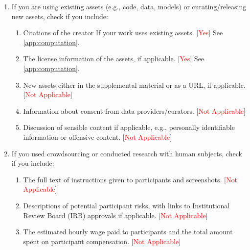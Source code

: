 \documentclass[twoside]{article}
\begin{document}
{\begin{enumerate}
\begin{enumerate}
   [\textcolor{red}{No}] We provide a working example in the Supplementary Material that demonstrates our method's core functionality and can reproduce the main experimental results; we commit to releasing the full codebase upon acceptance.
   \item All the training details (e.g., data splits, hyperparameters, how they were chosen). 
   
   [\textcolor{red}{Yes}] In  \cref{app:experiments} we provide all experimental details.
   
     \item A clear definition of the specific measure or statistics and error bars (e.g., with respect to the random seed after running experiments multiple times). 
     
     [\textcolor{red}{Yes}] See \cref{exp:image}, \cref{exp:bo}, \cref{exp:sbi} and \cref{app:experiments}.
    
    \item A description of the computing infrastructure used. (e.g., type of GPUs, internal cluster, or cloud provider). [\textcolor{red}{Yes}] See \cref{app:computation}.
 \end{enumerate}

 \item If you are using existing assets (e.g., code, data, models) or curating/releasing new assets, check if you include:
 \begin{enumerate}
   \item Citations of the creator If your work uses existing assets. [\textcolor{red}{Yes}] See \cref{app:computation}.
   \item The license information of the assets, if applicable. [\textcolor{red}{Yes}] See \cref{app:computation}.
   \item New assets either in the supplemental material or as a URL, if applicable. [\textcolor{red}{Not Applicable}]
   \item Information about consent from data providers/curators. [\textcolor{red}{Not Applicable}]
   \item Discussion of sensible content if applicable, e.g., personally identifiable information or offensive content. [\textcolor{red}{Not Applicable}]
 \end{enumerate}

 \item If you used crowdsourcing or conducted research with human subjects, check if you include:
 \begin{enumerate}
   \item The full text of instructions given to participants and screenshots. [\textcolor{red}{Not Applicable}]
   \item Descriptions of potential participant risks, with links to Institutional Review Board (IRB) approvals if applicable. [\textcolor{red}{Not Applicable}]
   \item The estimated hourly wage paid to participants and the total amount spent on participant compensation. [\textcolor{red}{Not Applicable}]
 \end{enumerate}

 \end{enumerate}
}

\appendix


\end{document}
